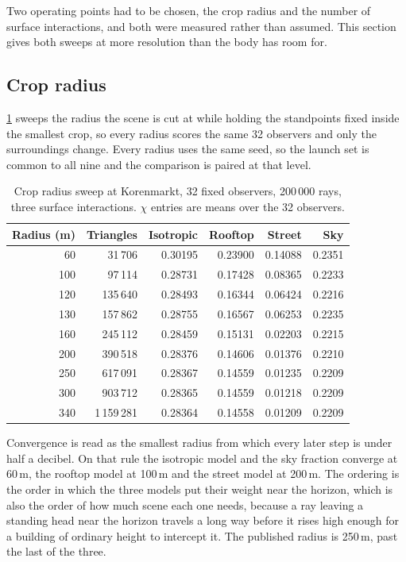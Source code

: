 \documentclass[journal]{IEEEtran}
\begin{document}
Two operating points had to be chosen, the crop radius and the number of surface
interactions, and both were measured rather than assumed. This section gives
both sweeps at more resolution than the body has room for.

\subsection{Crop radius}

\cref{tab:si-crop} sweeps the radius the scene is cut at while holding the
standpoints fixed inside the smallest crop, so every radius scores the same 32
observers and only the surroundings change. Every radius uses the same seed, so
the launch set is common to all nine and the comparison is paired at that level.

\begin{table}[t]
  \centering
  \caption{Crop radius sweep at Korenmarkt, 32 fixed observers, 200\,000 rays,
  three surface interactions. $\chi$ entries are means over the 32 observers.}
  \label{tab:si-crop}
  \footnotesize
  \setlength{\tabcolsep}{4pt}
  \begin{tabular}{rrrrrr}
    \toprule
    Radius (m) & Triangles & Isotropic & Rooftop & Street & Sky \\
    \midrule
    60  & 31\,706    & 0.30195 & 0.23900 & 0.14088 & 0.2351 \\
    100 & 97\,114    & 0.28731 & 0.17428 & 0.08365 & 0.2233 \\
    120 & 135\,640   & 0.28493 & 0.16344 & 0.06424 & 0.2216 \\
    130 & 157\,862   & 0.28755 & 0.16567 & 0.06253 & 0.2235 \\
    160 & 245\,112   & 0.28459 & 0.15131 & 0.02203 & 0.2215 \\
    200 & 390\,518   & 0.28376 & 0.14606 & 0.01376 & 0.2210 \\
    250 & 617\,091   & 0.28367 & 0.14559 & 0.01235 & 0.2209 \\
    300 & 903\,712   & 0.28365 & 0.14559 & 0.01218 & 0.2209 \\
    340 & 1\,159\,281 & 0.28364 & 0.14558 & 0.01209 & 0.2209 \\
    \bottomrule
  \end{tabular}
\end{table}

Convergence is read as the smallest radius from which every later step is under
half a decibel. On that rule the isotropic model and the sky fraction converge
at 60\,m, the rooftop model at 100\,m and the street model at 200\,m. The
ordering is the order in which the three models put their weight near the
horizon, which is also the order of how much scene each one needs, because a ray
leaving a standing head near the horizon travels a long way before it rises high
enough for a building of ordinary height to intercept it. The published radius
is 250\,m, past the last of the three.
\end{document}
